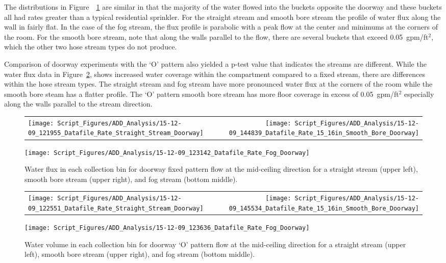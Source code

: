 \documentclass[12pt,oneside]{book}
\begin{document}
The distributions in Figure~~\ref{fig:Doorway_Varying_Nozzle_Types_Fixed_Pattern} are similar in that the majority of the water flowed into the buckets opposite the doorway and these buckets all had rates greater than a typical residential sprinkler. For the straight stream and smooth bore stream the profile of water flux along the wall in fairly flat. In the case of the fog stream, the flux profile is parabolic with a peak flow at the center and minimums at the corners of the room. For the smooth bore stream, note that along the walls parallel to the flow, there are several buckets that exceed 0.05~gpm/ft$^2$, which the other two hose stream types do not produce. 

Comparison of doorway experiments with the `O' pattern also yielded a p-test value that indicates the streams are different. While the water flux data in Figure~\ref{fig:Doorway_Varying_Nozzle_Types_O_Pattern}, shows increased water coverage within the compartment compared to a fixed stream, there are differences within the hose stream types. The straight stream and fog stream have more pronounced water flux at the corners of the room while the smooth bore steam has a flatter profile. The `O' pattern smooth bore stream has more floor coverage in excess of 0.05~gpm/ft$^2$ especially along the walls parallel to the stream direction.


\begin{figure}[!ht]
\begin{tabular*}{\textwidth}{lr}
\texttt{[image: Script\_Figures/ADD\_Analysis/15-12-09\_121955\_Datafile\_Rate\_Straight\_Stream\_Doorway]} &
\texttt{[image: Script\_Figures/ADD\_Analysis/15-12-09\_144839\_Datafile\_Rate\_15\_16in\_Smooth\_Bore\_Doorway]} \\
\end{tabular*}
\centering
\texttt{[image: Script\_Figures/ADD\_Analysis/15-12-09\_123142\_Datafile\_Rate\_Fog\_Doorway]} \\
\caption[Water Flux for Varying Doorway Fixed Pattern Hose Stream Types]{Water flux in each collection bin for doorway fixed pattern flow at the mid-ceiling direction for a straight stream (upper left), smooth bore stream (upper right), and fog stream (bottom middle).}
\label{fig:Doorway_Varying_Nozzle_Types_Fixed_Pattern}
\end{figure}

\begin{figure}[ht]
\begin{tabular*}{\textwidth}{lr}
\texttt{[image: Script\_Figures/ADD\_Analysis/15-12-09\_122551\_Datafile\_Rate\_Straight\_Stream\_Doorway]} &
\texttt{[image: Script\_Figures/ADD\_Analysis/15-12-09\_145534\_Datafile\_Rate\_15\_16in\_Smooth\_Bore\_Doorway]} \\
\end{tabular*}
\centering
\texttt{[image: Script\_Figures/ADD\_Analysis/15-12-09\_123636\_Datafile\_Rate\_Fog\_Doorway]}
\caption[Water Flux for Varying Doorway `O' Pattern Hose Stream Types]{Water volume in each collection bin for doorway `O' pattern flow at the mid-ceiling direction for a straight stream (upper left), smooth bore stream (upper right), and fog stream (bottom middle).}
\label{fig:Doorway_Varying_Nozzle_Types_O_Pattern}
\end{figure}
\end{document}
